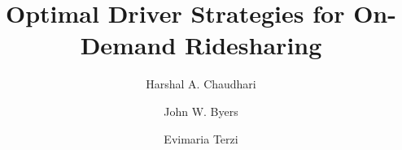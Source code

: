 \documentclass[sigconf]{acmart}
\begin{document}
\title{Optimal Driver Strategies for On-Demand Ridesharing}

\author{Harshal A. Chaudhari}

\author{John W. Byers}

\author{Evimaria Terzi}


%
%
% 





\maketitle









%
 
\end{document}
